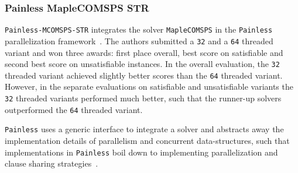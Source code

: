 \documentclass{elsarticle}
\makeatletter
\newcommand{\solver}[1]{\texttt{#1}}
\newcommand{\stack}[1]{%
\begin{tabular}{@{}l@{}}#1\checknextarg}
\newcommand{\checknextarg}{\@ifnextchar\bgroup{\gobblenextarg}{\end{tabular}}}
\newcommand{\gobblenextarg}[1]{\\#1\@ifnextchar\bgroup{\gobblenextarg}{\end{tabular}}}
\makeatother
\begin{document}


\subsubsection{Painless MapleCOMSPS STR} 

\solver{Painless-MCOMSPS-STR} integrates the solver \solver{MapleCOMSPS} in the \solver{Painless} parallelization framework~\cite{Frioux:2017:Painless,Liang:2017:Maplecomsps}. 
The authors submitted a \solver{32} and a \solver{64} threaded variant and won three awards: first place overall, best score on satisfiable and second best score on unsatisfiable instances. 
In the overall evaluation, the \solver{32} threaded variant achieved slightly better scores than the \solver{64} threaded variant. 
However, in the separate evaluations on satisfiable and unsatisfiable variants the \solver{32} threaded variants performed much better, such that the runner-up solvers outperformed the \solver{64} threaded variant. 

\solver{Painless} uses a generic interface to integrate a solver and abstracts away the implementation details of parallelism and concurrent data-structures, such that implementations in \solver{Painless} boil down to implementing parallelization and clause sharing strategies~\cite{Frioux:2017:Painless}. 
\end{document}
